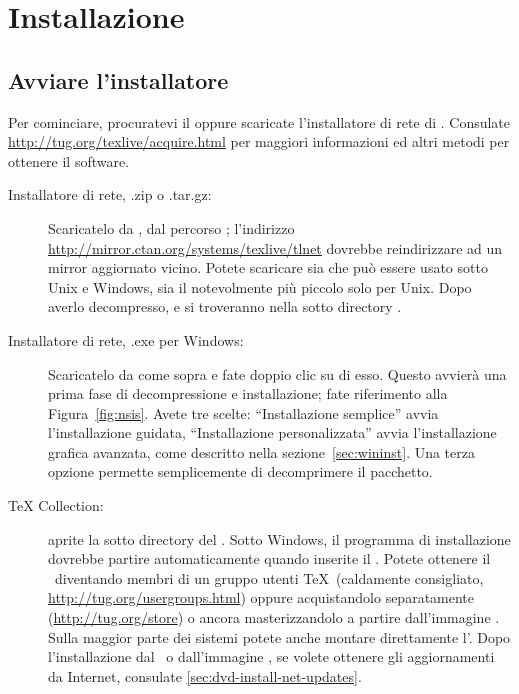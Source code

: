 \documentclass{article}
\begin{document}
\section{Installazione}
\label{sec:install}

\subsection{Avviare l'installatore}
\label{sec:inst-start}

Per cominciare, procuratevi il \DVD{} \TK{} oppure scaricate
l'installatore di rete di \TL. Consulate
\url{http://tug.org/texlive/acquire.html} per maggiori informazioni ed
altri metodi per ottenere il software.

\begin{description} \item [Installatore di rete, .zip o .tar.gz:]
Scaricatelo da \CTAN, dal percorso ;
l'indirizzo \url{http://mirror.ctan.org/systems/texlive/tlnet}
dovrebbe reindirizzare ad un mirror aggiornato vicino. Potete
scaricare sia  che può essere usato sotto
Unix e Windows, sia il notevolmente più piccolo
 solo per Unix. Dopo averlo
decompresso,  e
 si troveranno nella sotto
directory .

\item [Installatore di rete, .exe per Windows:] Scaricatelo da \CTAN{}
come sopra e fate doppio clic su di esso. Questo avvierà una prima fase
di decompressione e installazione; fate riferimento alla
Figura~\ref{fig:nsis}. Avete tre scelte: ``Installazione semplice'' avvia
l'installazione guidata, ``Installazione personalizzata'' avvia
l'installazione grafica avanzata, come descritto nella
sezione~\ref{sec:wininst}. Una terza opzione permette semplicemente di
decomprimere il pacchetto.

\item [\DVD{} \TeX{} Collection:] aprite la sotto directory
 del \DVD. Sotto Windows, il programma di installazione
dovrebbe partire automaticamente quando inserite il \DVD. Potete ottenere il
\DVD\ diventando membri di un gruppo utenti \TeX\ (caldamente consigliato,
\url{http://tug.org/usergroups.html}) oppure acquistandolo separatamente
(\url{http://tug.org/store}) o ancora masterizzandolo a partire
dall'immagine \ISO. Sulla maggior parte dei sistemi potete anche montare
direttamente l'\ISO. Dopo l'installazione dal \DVD\ o dall'immagine \ISO, se
volete ottenere gli aggiornamenti da Internet, consulate
\ref{sec:dvd-install-net-updates}.

\end{description}
\end{document}
